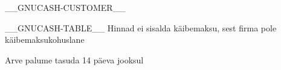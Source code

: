 \documentclass[paper=a4, pagesize, DIN, pagenumber=false, parskip=half, %
               firsthead=false, backaddress=false, subject=underlined, foldmarks=false, %
               fromalign=off, fromphone=false, %
               fromemail=false, fromurl=false, %
               fromlogo=false, fromrule=true]{scrlttr2}
\begin{document}

\begin{letter}{__GNUCASH-CUSTOMER__}

\opening{}

__GNUCASH-TABLE__
Hinnad ei sisalda käibemaksu, sest firma pole käibemaksukohuslane

\closing{Arve palume tasuda 14 päeva jooksul}

\end{letter}
\end{document}
